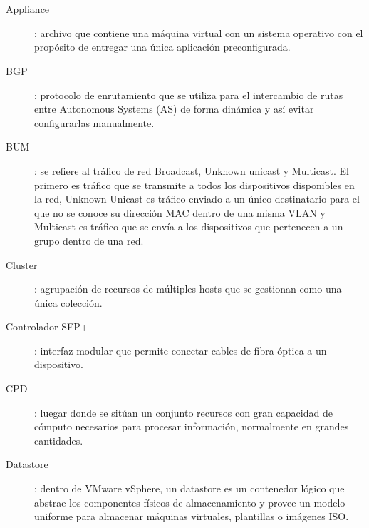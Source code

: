 \chapter*{\nomeglosariotermos}
\label{chap:glosario-termos}


\begin{description}
   \item [Appliance]: archivo que contiene una máquina virtual con un sistema operativo con el propósito de entregar una única aplicación preconfigurada.
   \label{itm:appliance}
   \item [BGP]\cite{bgp}: protocolo de enrutamiento que se utiliza para el intercambio de rutas entre Autonomous Systems (AS) de forma dinámica y así evitar configurarlas manualmente.
   \label{itm:bgp}
   \item [BUM]: se refiere al tráfico de red Broadcast, Unknown unicast y Multicast. El primero es tráfico que se transmite a todos los dispositivos disponibles en la red, Unknown Unicast es tráfico enviado a un único destinatario para el que no se conoce su dirección MAC dentro de una misma VLAN y Multicast es tráfico que se envía a los dispositivos que pertenecen a un grupo dentro de una red.
   \label{itm:bum}
   \item [Cluster]\cite{cluster-vmware}: agrupación de recursos de múltiples hosts que se gestionan como una única colección.
   \label{itm:cluster}
   \item [Controlador SFP+]: interfaz modular que permite conectar cables de fibra óptica a un dispositivo.
   \label{itm:sfp} 
  \item [CPD]: luegar donde se sitúan un conjunto recursos con gran capacidad de cómputo necesarios para procesar información, normalmente en grandes cantidades.
  \label{itm:cpd}
  \item [Datastore]: dentro de VMware vSphere, un datastore es un contenedor lógico que abstrae los componentes físicos de almacenamiento y provee un modelo uniforme para almacenar máquinas virtuales, plantillas o imágenes ISO.

\end{description}
